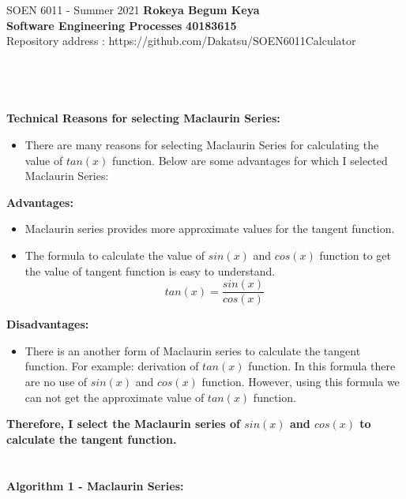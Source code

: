 \documentclass[letterpaper, 11pt]{report}
\begin{document}
\section*{}
\normalsize {SOEN 6011 - Summer 2021} \hfill \textbf{Rokeya Begum Keya} \\
\textbf{ Software Engineering Processes}  \hfill \textbf{40183615} \\
\hfill Repository address : https://github.com/Dakatsu/SOEN6011Calculator
\\\\\\
\textbf{\\ \\ Technical Reasons for selecting Maclaurin Series: }
\begin{itemize}
\item There are many reasons for selecting Maclaurin Series for calculating the value of $tan(x)$ function. Below are some advantages for which I selected Maclaurin Series:
\end{itemize}
\textbf{Advantages: }
\begin{itemize}
\item Maclaurin series provides more approximate values for the tangent function.
\item The formula to calculate the value of $sin(x)$ and $cos(x)$ function to get the value of tangent function is easy to understand.\[tan(x) = \frac{sin(x)}{cos(x)}\]
\end{itemize}
\textbf{Disadvantages: }
\begin{itemize}
\item There is an another form of Maclaurin series to calculate the tangent function. For example: derivation of $tan(x)$ function. In this formula there are no use of $sin(x)$ and $cos(x)$ function. However, using this formula we can not get the approximate value of $tan(x)$ function.
\end{itemize}
\textbf{Therefore, I select the Maclaurin series of $sin(x)$ and $cos(x)$ to calculate the tangent function.}
\\
\textbf{\\ \\ Algorithm 1 - Maclaurin Series: } 
\end{document}
